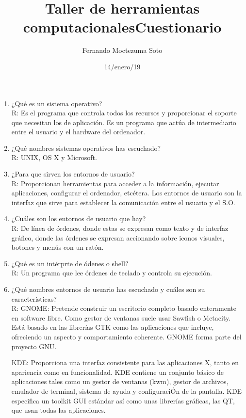 \documentclass[etterpaper, 12pt, oneside]{article}%
\title{\Huge Taller de herramientas computacionales}
\author{Fernando Moctezuma Soto}
\date{14/enero/19}
\begin{document}
	\maketitle
	
	\newpage
	
	\title{\Huge Cuestionario\\}

	\begin{enumerate}
		\item ¿Qué es un sistema operativo?
		\\R: Es el programa que controla todos los recursos y proporcionar el soporte que necesitan los de aplicación. Es un programa que actúa de intermediario entre el usuario y el hardware del ordenador.
	
		\item ¿Qué nombres sistemas operativos has escuchado?
		\\R: UNIX, OS X y Microsoft.
		
		\item ¿Para que sirven los entornos de usuario?
		\\R: Proporcionan herramientas para acceder a la información, ejecutar aplicaciones, configurar el ordenador, etcétera. Los entornos de usuario son la interfaz que sirve para establecer la comunicación entre
el usuario y el S.O. 

		\item ¿Cuáles son los entornos de usuario que hay?
		\\R: De línea de órdenes, donde estas se expresan como texto y de interfaz gráfico, donde las órdenes se expresan accionando sobre iconos visuales, botones y menús con un ratón.
		
		\item ¿Qué es un intérprte de ódenes o shell?
		\\R: Un programa que lee órdenes de teclado y controla su ejecución.

		\item ¿Qué nombres entornos de usuario has escuchado y cuáles son su características?
		\\R: GNOME: Pretende construir un escritorio completo basado enteramente en software libre. Como gestor de ventanas suele usar Sawfish o Metacity. Está basado en las librerías GTK como las aplicaciones que incluye, ofreciendo un aspecto y comportamiento coherente. GNOME forma parte del proyecto GNU.
		
KDE: Proporciona una interfaz consistente para las aplicaciones X, tanto en apariencia como en funcionalidad. KDE contiene un conjunto básico de aplicaciones tales como un gestor de ventanas (kwm), gestor de archivos, emulador de terminal, sistema de ayuda y configuraciÓn de la pantalla. KDE especifica un toolkit GUI estándar así como unas librerías gráficas, las QT, que usan todas las aplicaciones. 
		

\end{enumerate}
\end{document}
